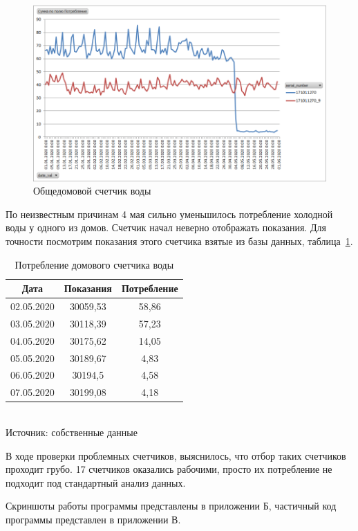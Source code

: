 \begin{figure}[H]
	\centering
	\includegraphics[width=0.7\linewidth]{pics/dom}
	\caption{Общедомовой счетчик воды}
	\label{fig:dom}
\end{figure}
По неизвестным причинам 4 мая сильно уменьшилось потребление холодной воды у одного из домов. Счетчик начал неверно отображать показания. Для точности посмотрим показания этого счетчика взятые из базы данных, таблица~\ref{tab:tab4}.
\begin{table}[H]
\caption{Потребление домового счетчика воды} \label{tab:tab4}
\centering
\begin{tabular}{|c|c|c|}
	\hline 
	Дата & Показания & Потребление \\ 
	\hline 
	02.05.2020 & 30059,53 & 58,86 \\ 
	\hline 
	03.05.2020 & 30118,39 & 57,23 \\ 
	\hline 
	04.05.2020 & 30175,62 & 14,05 \\ 
	\hline 
	05.05.2020 & 30189,67 & 4,83 \\ 
	\hline 
	06.05.2020 & 30194,5 & 4,58 \\ 
	\hline 
	07.05.2020 & 30199,08 & 4,18 \\ 
	\hline 
\end{tabular} 
\\Источник: собственные данные
\end{table}

В ходе проверки проблемных счетчиков, выяснилось, что отбор таких счетчиков проходит грубо. 17 счетчиков оказались рабочими, просто их потребление не подходит под стандартный анализ данных.

Скриншоты работы программы представлены в приложении Б, частичный код программы представлен в приложении В.